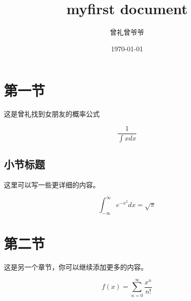 \documentclass[12pt]{article} %
\title{myfirst document}
\author{曾礼曾爷爷}
\date{\today}
\begin{document}
\maketitle %

\section{第一节} %
这是曾礼找到女朋友的概率公式

$$
\frac{1}{\int{xdx}}
$$


\subsection{小节标题} %
这里可以写一些更详细的内容。

\begin{equation}
\int_{-\infty}^{\infty} e^{-x^2} dx = \sqrt{\pi}
\end{equation}

\section{第二节}
这是另一个章节，你可以继续添加更多的内容。

\begin{equation}
f(x) = \sum_{n=0}^{\infty} \frac{x^n}{n!}
\end{equation}
\end{document}
